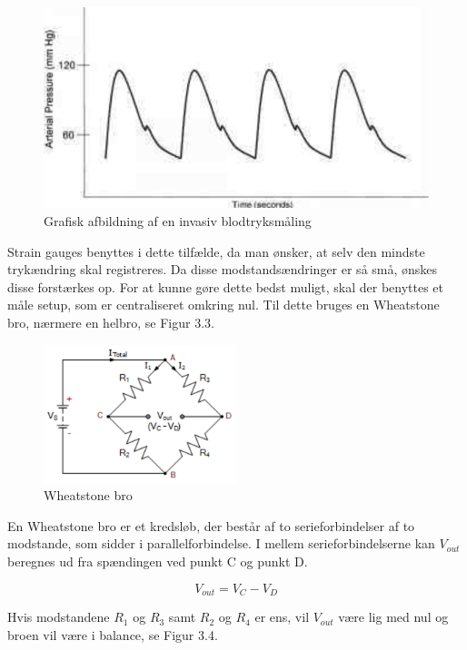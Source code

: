 \begin{figure}[H]
	\centering
	\includegraphics[width=1\textwidth]{Figurer/Snip20151207_51}
	\caption{Grafisk afbildning af en invasiv blodtryksmåling}
\end{figure}

Strain gauges benyttes i dette tilfælde, da man ønsker, at selv den mindste trykændring skal registreres. Da disse modstandsændringer er så små, ønskes disse forstærkes op. For at kunne gøre dette bedst muligt, skal der benyttes et måle setup, som er centraliseret omkring nul. Til dette bruges en Wheatstone bro, nærmere en helbro, se Figur 3.3. 

\begin{figure}[H]
	\centering
	\includegraphics[width=0.5\textwidth]{Figurer/Snip20151207_63}
	\caption{Wheatstone bro}
\end{figure}

En Wheatstone bro er et kredsløb, der består af to serieforbindelser af to modstande, som sidder i parallelforbindelse. I mellem serieforbindelserne kan $V_{out}$ beregnes ud fra spændingen ved punkt C og punkt D.

\begin{equation}
	V_{out} = V_{C} - V_{D}
\end{equation} 

Hvis modstandene $R_{1}$ og $R_{3}$ samt $R_{2}$ og $R_{4}$ er ens, vil $V_{out}$ være lig med nul og broen vil være i balance, se Figur 3.4. 

